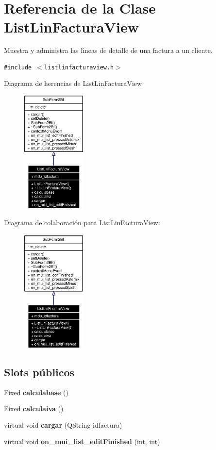 \section{Referencia de la Clase List\-Lin\-Factura\-View}
\label{classListLinFacturaView}
Muestra y administra las l\'{\i}neas de detalle de una factura a un cliente.  


{\tt \#include $<$listlinfacturaview.h$>$}

Diagrama de herencias de List\-Lin\-Factura\-View\begin{figure}[H]
\begin{center}
\leavevmode
\includegraphics[width=94pt]{classListLinFacturaView__inherit__graph}
\end{center}
\end{figure}
Diagrama de colaboraci\'{o}n para List\-Lin\-Factura\-View:\begin{figure}[H]
\begin{center}
\leavevmode
\includegraphics[width=94pt]{classListLinFacturaView__coll__graph}
\end{center}
\end{figure}
\subsection*{Slots p\'{u}blicos}
\begin{CompactItemize}
\item 
Fixed {\bf calculabase} ()\label{classListLinFacturaView_i0}

\item 
Fixed {\bf calculaiva} ()\label{classListLinFacturaView_i1}

\item 
virtual void {\bf cargar} (QString idfactura)\label{classListLinFacturaView_i2}

\item 
virtual void {\bf on\_\-mui\_\-list\_\-edit\-Finished} (int, int)\label{classListLinFacturaView_i3}

\end{CompactItemize}
